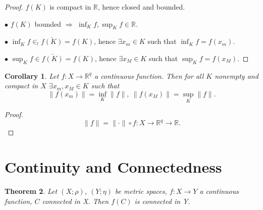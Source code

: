 \documentclass[12pt]{amsbook}
\newtheorem{theorem}{Theorem}[section]
\newtheorem{corollary}[theorem]{Corollary}
\theoremstyle{definition}
\newcommand{\RR}{{\mathbb R}}
\newcommand{\Ra}{\Rightarrow} %
\newcommand{\ra}{\rightarrow} %
\begin{document}

\begin{proof}
$f(K)$ is compact in $\RR$, hence closed and bounded.

$\bullet$ $f(K)$ bounded $\Ra$ $\inf_K f, \sup_K f \in \RR$.

$\bullet$ $\inf_K f \in_! \bar{f(K)} = f(K)$, hence $\exists x_m \in K$ such that $\inf_K f = f(x_m)$. 

$\bullet$ $\sup_K f \in \bar{f(K)} = f(K)$, hence $\exists x_M \in K$ such that $\sup_K f = f(x_M)$. 
\end{proof}

\begin{corollary}
Let $f: X \ra \RR^q$ a continuous function. Then for all $K$ nonempty and compact in $X$ $\exists x_m, x_M \in K$ such that 
\begin{equation*} \|f(x_m)\| = \inf_K \|f\|, \ \|f(x_M)\| = \sup_K \|f\|.\end{equation*}
\end{corollary}

\begin{proof}
\begin{equation*} \|f\| = \|\cdot\| \circ f : X \ra \RR^q \ra \RR. \end{equation*}
\end{proof}

\section{Continuity and Connectedness}

\begin{theorem}
Let $(X; \rho)$, $(Y; \eta)$ be metric spaces, $f: X \ra Y$ a continuous function, $C$ connected in X. Then $f(C)$ is connected in Y.
\end{theorem}
\end{document}
